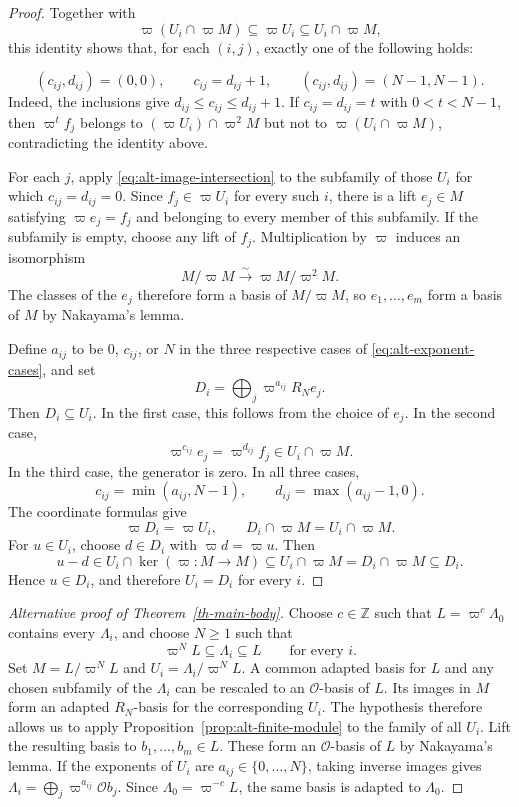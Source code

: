 \documentclass[12pt]{amsart}
\theoremstyle{definition}
\theoremstyle{remark}
\begin{document}
\begin{proof}
Together with
\[
  \varpi(U_i\cap\varpi M)
  \subseteq\varpi U_i\subseteq U_i\cap\varpi M,
\]
this identity shows that, for each $(i,j)$, exactly one of
the following holds:



\begin{equation}\label{eq:alt-exponent-cases}
 (c_{ij},d_{ij})=(0,0),\qquad c_{ij}=d_{ij}+1,
 \qquad (c_{ij},d_{ij})=(N-1,N-1).
\end{equation}
Indeed, the inclusions give $d_{ij}\leq c_{ij}\leq d_{ij}+1$.
If $c_{ij}=d_{ij}=t$ with $0<t<N-1$, then
$\varpi^tf_j$ belongs to $(\varpi U_i)\cap\varpi^2M$
but not to $\varpi(U_i\cap\varpi M)$, contradicting the
identity above.

For each $j$, apply \eqref{eq:alt-image-intersection} to
the subfamily of those $U_i$ for which $c_{ij}=d_{ij}=0$.
Since $f_j\in\varpi U_i$ for every such $i$, there is a
lift $e_j\in M$ satisfying $\varpi e_j=f_j$ and belonging
to every member of this subfamily.
If the subfamily is empty, choose any lift of $f_j$.
Multiplication by $\varpi$ induces an isomorphism
\[
  M/\varpi M\xrightarrow{\sim}\varpi M/\varpi^2M.
\]
The classes of the $e_j$ therefore form a basis of
$M/\varpi M$, so $e_1,\ldots,e_m$ form a basis of $M$
by Nakayama's lemma.

Define $a_{ij}$ to be $0$, $c_{ij}$, or $N$ in the three
respective cases of \eqref{eq:alt-exponent-cases}, and set
\[
  D_i=\bigoplus_j\varpi^{a_{ij}}R_Ne_j.
\]
Then $D_i\subseteq U_i$.
In the first case, this follows from the choice of $e_j$.
In the second case,
\[
  \varpi^{c_{ij}}e_j
  =\varpi^{d_{ij}}f_j\in U_i\cap\varpi M.
\]
In the third case, the generator is zero. In all three cases,
\[
  c_{ij}=\min(a_{ij},N-1),
  \qquad
  d_{ij}=\max(a_{ij}-1,0).
\]
The coordinate formulas give
\[
  \varpi D_i=\varpi U_i,
  \qquad D_i\cap\varpi M=U_i\cap\varpi M.
\]
For $u\in U_i$, choose $d\in D_i$ with $\varpi d=\varpi u$.
Then
\[
  u-d\in U_i\cap\ker(\varpi:M\to M)
  \subseteq U_i\cap\varpi M
  =D_i\cap\varpi M\subseteq D_i.
\]
Hence $u\in D_i$, and therefore $U_i=D_i$ for every $i$.
\end{proof}

\begin{proof}[Alternative proof of Theorem~\ref{th-main-body}]
Choose $c\in\mathbb Z$ such that $L=\varpi^c\Lambda_0$
contains every $\Lambda_i$, and choose $N\geq1$ such that
\[
  \varpi^NL\subseteq\Lambda_i\subseteq L
  \qquad\text{for every }i.
\]
Set $M=L/\varpi^NL$ and $U_i=\Lambda_i/\varpi^NL$. A common adapted basis for $L$ and any chosen subfamily of the $\Lambda_i$ can be rescaled to an $\mathcal O$-basis of $L$. Its images in $M$ form an adapted $R_N$-basis for the
corresponding $U_i$. The hypothesis therefore allows us to apply Proposition~\ref{prop:alt-finite-module} to the family of all $U_i$. Lift the resulting basis to $b_1,\ldots,b_m\in L$. These form an $\mathcal O$-basis of $L$ by Nakayama's lemma. If the exponents of $U_i$ are $a_{ij}\in\{0,\ldots,N\}$, taking inverse images gives $\Lambda_i=\bigoplus_j\varpi^{a_{ij}}\mathcal O b_j$. Since $\Lambda_0=\varpi^{-c}L$, the same basis is
adapted to $\Lambda_0$.
\end{proof}
\end{document}
